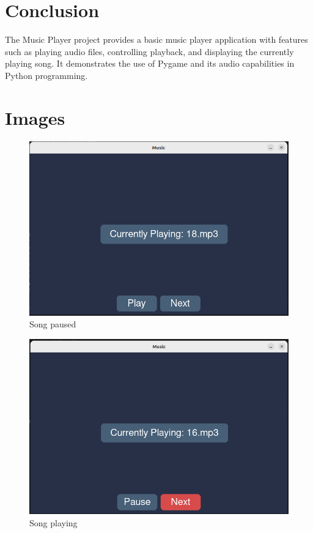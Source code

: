 \documentclass[journal,12pt,twocolumn]{IEEEtran}
\begin{document}
\section{Conclusion}
The Music Player project provides a basic music player application with features such as playing audio files, controlling playback, and displaying the currently playing song. It demonstrates the use of Pygame and its audio capabilities in Python programming.


\section{Images}
    \begin{figure}[h]
        \includegraphics[width=\columnwidth]{figs/img1.png}
        \caption{Song paused}
        \label{output1}
    \end{figure}

    \begin{figure}[h]
        \includegraphics[width=\columnwidth]{figs/img2.png}
        \caption{Song playing}
        \label{output2}
    \end{figure}
\end{document}
